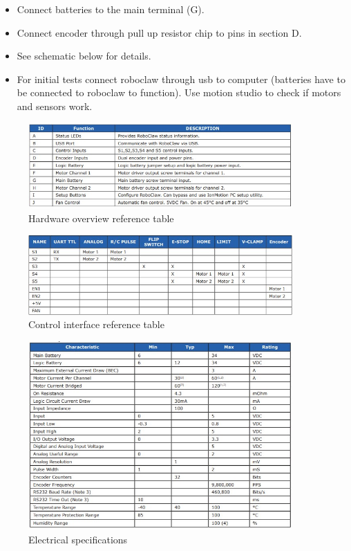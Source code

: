 \documentclass[12pt,letterpaper,oneside]{article}
\begin{document}
\begin{itemize}
    \item Connect batteries to the main terminal (G).
    \item Connect encoder through pull up resistor chip to pins in section D.
    \item See schematic below for details.
    \item For initial tests connect roboclaw through usb to computer (batteries have to be connected to roboclaw to function). Use motion studio to check if motors and sensors work.
\end{itemize}

\newpage
\begin{figure}[h]
    \centering
    \includegraphics[width=0.9\textwidth]{figures/roboclawHardwareTable.jpg}
    \caption{Hardware overview reference table}
    \label{fig:my_label}
\end{figure}

\begin{figure}[h]
    \centering
    \includegraphics[width=0.9\textwidth]{figures/roboclawPinTable.jpg}
    \caption{Control interface reference table}
    \label{fig:my_label}
\end{figure}

\newpage
\begin{figure}[h]
    \centering
    \includegraphics[width=0.9\textwidth]{figures/electricalSpecsTable.jpg}
    \caption{Electrical specifications}
    \label{fig:my_label}
\end{figure}
\end{document}
